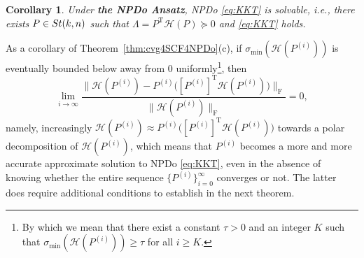 \documentclass[11pt]{article}
\def\scrH{\mathscr{H}}
\newcommand\STM[2]{{\rm St}(#1,#2)}
\DeclareMathOperator{\F}{F}
\DeclareMathOperator{\T}{T}
\newtheorem{corollary}{Corollary}[section]
\theoremstyle{definition}
\numberwithin{equation}{section}
\begin{document}
\begin{corollary}\label{cor:cvg4SCF4NPDo}
Under {\bf the NPDo Ansatz},
NPDo \eqref{eq:KKT} is solvable, i.e., there exists $P\in\STM{k}{n}$ such that $\Lambda=P^{\T}\scrH(P)\succeq 0$ and \eqref{eq:KKT} holds.
\end{corollary}

As a corollary of Theorem~\ref{thm:cvg4SCF4NPDo}(c),
if $\sigma_{\min}(\scrH(P^{(i)}))$ is eventually bounded below away from $0$
uniformly\footnote {By which we mean that there exist a constant $\tau>0$ and an integer $K$ such that
  $\sigma_{\min}(\scrH(P^{(i)}))\ge\tau$ for all $i\ge K$.},
then
$$
\lim_{i\to\infty}\frac {\big\|\scrH(P^{(i)})-P^{(i)}\big([P^{(i)}]^{\T}\scrH(P^{(i)})\big)\big\|_{\F}}
                       {\big\|\scrH(P^{(i)})\big\|_{\F}} =0,
$$
namely, increasingly $\scrH(P^{(i)})\approx P^{(i)}\big([P^{(i)}]^{\T}\scrH(P^{(i)})\big)$ towards
a polar decomposition of $\scrH(P^{(i)})$, which means that $P^{(i)}$ becomes a more and more accurate approximate solution
to NPDo \eqref{eq:KKT}, even in the absence of knowing whether the entire sequence $\{P^{(i)}\}_{i=0}^{\infty}$ converges or not.
The latter does require additional conditions to establish in the next theorem.
\end{document}

